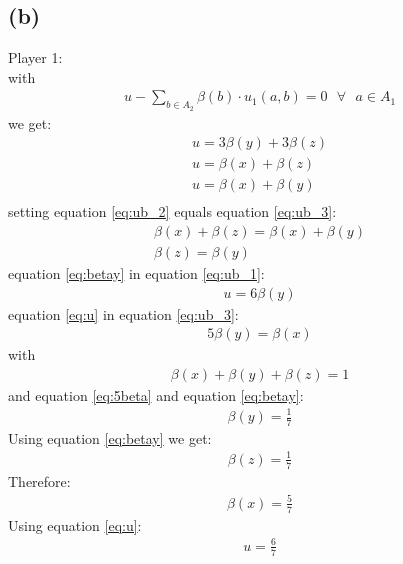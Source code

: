 \documentclass[a4paper,
  twoside, %
  headlines=2.1 %
  ]{scrartcl}
\begin{document}
\subsection*{(b)}
Player 1:\\
with
\begin{align}
     u - \sum_{b \in A_2} \beta(b) \cdot u_1(a,b) = 0 \text{ } \forall \text{ } a \in A_1
\end{align}
we get: 
\begin{align}
     u = 3\beta(y) + 3\beta(z) \label{eq:ub_1}\\
     u = \beta(x) + \beta(z)  \label{eq:ub_2}\\
     u = \beta(x) + \beta(y) \label{eq:ub_3}\\
\end{align}
setting equation \ref{eq:ub_2} equals equation \ref{eq:ub_3}:
\begin{align}
    \beta(x) + \beta(z)= \beta(x) + \beta(y)\\
    \beta(z) = \beta(y) \label{eq:betay}
\end{align}
equation \ref{eq:betay} in equation \ref{eq:ub_1}:
\begin{align}
    u = 6 \beta(y) \label{eq:u}
\end{align}
equation \ref{eq:u} in equation \ref{eq:ub_3}:
\begin{align}
    5\beta(y) = \beta(x) \label{eq:5beta}
\end{align}
with 
\begin{align}
    \beta(x)+\beta(y)+\beta(z) =1
\end{align}
and equation \ref{eq:5beta} and equation \ref{eq:betay}:
\begin{align}
    \beta(y) = \frac{1}{7}
\end{align}
Using equation \ref{eq:betay} we get:
\begin{align}
    \beta(z) = \frac{1}{7}
\end{align}
Therefore:
\begin{align}
    \beta(x) = \frac{5}{7}
\end{align}
Using equation \ref{eq:u}:
\begin{align}
    u = \frac{6}{7}
\end{align}
\end{document}
